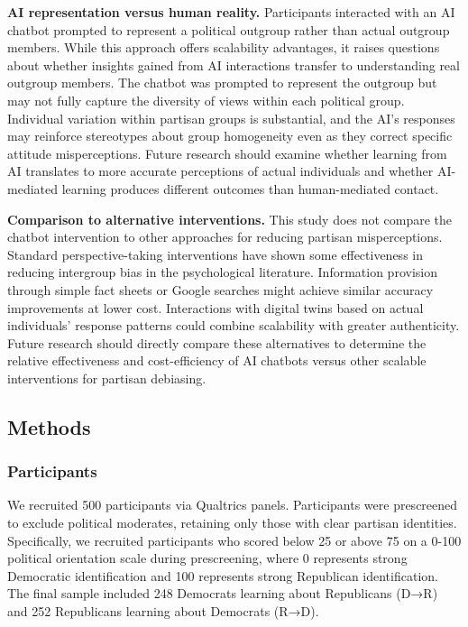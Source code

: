 \documentclass[
  11pt,
  oneside]{article}
\begin{document}
\textbf{AI representation versus human reality.} Participants interacted
with an AI chatbot prompted to represent a political outgroup rather
than actual outgroup members. While this approach offers scalability
advantages, it raises questions about whether insights gained from AI
interactions transfer to understanding real outgroup members. The
chatbot was prompted to represent the outgroup but may not fully capture
the diversity of views within each political group. Individual variation
within partisan groups is substantial, and the AI's responses may
reinforce stereotypes about group homogeneity even as they correct
specific attitude misperceptions. Future research should examine whether
learning from AI translates to more accurate perceptions of actual
individuals and whether AI-mediated learning produces different outcomes
than human-mediated contact.

\textbf{Comparison to alternative interventions.} This study does not
compare the chatbot intervention to other approaches for reducing
partisan misperceptions. Standard perspective-taking interventions have
shown some effectiveness in reducing intergroup bias in the
psychological literature. Information provision through simple fact
sheets or Google searches might achieve similar accuracy improvements at
lower cost. Interactions with digital twins based on actual individuals'
response patterns could combine scalability with greater authenticity.
Future research should directly compare these alternatives to determine
the relative effectiveness and cost-efficiency of AI chatbots versus
other scalable interventions for partisan debiasing.

\subsection{Methods}\label{methods}

\subsubsection{Participants}\label{participants}

We recruited 500 participants via Qualtrics panels. Participants were
prescreened to exclude political moderates, retaining only those with
clear partisan identities. Specifically, we recruited participants who
scored below 25 or above 75 on a 0-100 political orientation scale
during prescreening, where 0 represents strong Democratic identification
and 100 represents strong Republican identification. The final sample
included 248 Democrats learning about Republicans (D→R) and 252
Republicans learning about Democrats (R→D).
\end{document}

